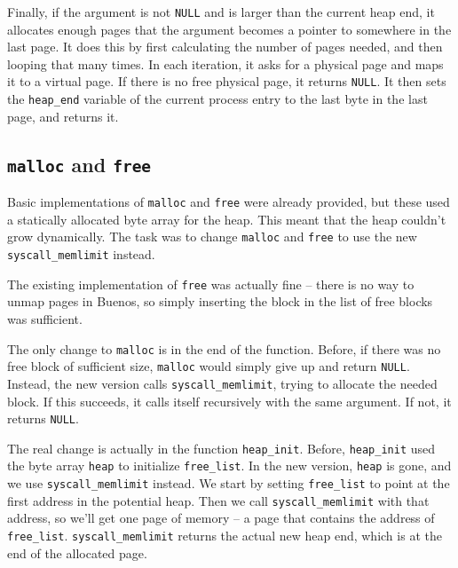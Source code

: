 \documentclass{article}
\begin{document}
Finally, if the argument is not \texttt{NULL} and is larger than the current heap end, it allocates enough pages that the argument becomes a pointer to somewhere in the last page. It does this by first calculating the number of pages needed, and then looping that many times. In each iteration, it asks for a physical page and maps it to a virtual page. If there is no free physical page, it returns \texttt{NULL}. It then sets the \texttt{heap\_end} variable of the current process entry to the last byte in the last page, and returns it.
%
\subsection{\texttt{malloc} and \texttt{free}}
%
Basic implementations of \texttt{malloc} and \texttt{free} were already provided, but these used a statically allocated byte array for the heap. This meant that the heap couldn't grow dynamically. The task was to change \texttt{malloc} and \texttt{free} to use the new \texttt{syscall\_memlimit} instead.

The existing implementation of \texttt{free} was actually fine -- there is no way to unmap pages in Buenos, so simply inserting the block in the list of free blocks was sufficient.

The only change to \texttt{malloc} is in the end of the function. Before, if there was no free block of sufficient size, \texttt{malloc} would simply give up and return \texttt{NULL}. Instead, the new version calls \texttt{syscall\_memlimit}, trying to allocate the needed block. If this succeeds, it calls itself recursively with the same argument. If not, it returns \texttt{NULL}.

The real change is actually in the function \texttt{heap\_init}. Before, \texttt{heap\_init} used the byte array \texttt{heap} to initialize \texttt{free\_list}. In the new version, \texttt{heap} is gone, and we use \texttt{syscall\_memlimit} instead. We start by setting \texttt{free\_list} to point at the first address in the potential heap. Then we call \texttt{syscall\_memlimit} with that address, so we'll get one page of memory -- a page that contains the address of \texttt{free\_list}. \texttt{syscall\_memlimit} returns the actual new heap end, which is at the end of the allocated page.
\end{document}
